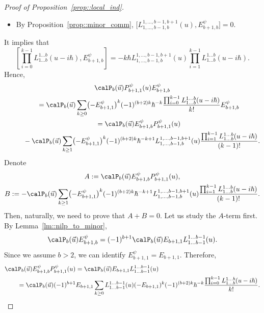 \begin{proof}[Proof of Proposition~\ref{prop::local_ind}]
\begin{itemize}
			\item By Proposition~\ref{prop::minor_comm},
$
			\bigl[L^{1,\dots,b-1,b+1}_{1,\dots,b-1,b}(u),E_{b+1,b}^{\psi}\bigr] = 0$.
		\end{itemize}
		It implies that
		\[
		\left[\prod_{i=0}^{k-1} L_{1\dots b}^{1\dots b}(u-i\hbar), E_{b+1,b}^{\psi} \right] = -k\hbar L_{1,\dots,b-1,b}^{1,\dots,b-1,b+1}(u) \prod_{i=1}^{k-1} L_{1\dots b}^{1\dots b}(u-i\hbar).
		\]
		Hence,
		\begin{gather*}
			\calP_{b}(\vec{u})P_{b+1,1}^{\psi}(u) E_{b+1,b}^{\psi} \\
			\qquad= \calP_{b}(\vec{u})\sum\limits_{k\geq 0} \bigl(-E_{b+1,1}^{\psi}\bigr)^k (-1)^{(b+2)k} \hbar^{-k} \frac{\prod_{i=0}^{k-1} L_{1\dots b}^{1\dots b}(u-i\hbar)}{k!} E_{b+1,b}^{\psi} \\
		\qquad	=\calP_{b}(\vec{u}) E_{b+1,b}^{\psi} P_{b+1,1}^{\psi}(u) \\
		\phantom{\qquad	=}{}	- \calP_{b}(\vec{u})\sum\limits_{k\geq 1} \bigl(-E_{b+1,1}^{\psi}\bigr)^k (-1)^{(b+2)k} \hbar^{-k+1} L_{1,\dots,b-1,b}^{1,\dots,b-1,b+1}(u) \frac{\prod_{i=1}^{k-1} L_{1\dots b}^{1\dots b}(u-i\hbar)}{(k-1)!}.
		\end{gather*}
		Denote
		\begin{gather}
				A := \calP_{b}(\vec{u}) E_{b+1,b}^{\psi} P_{b+1,1}^{\psi}(u),\nonumber \\
				B := -\calP_{b}(\vec{u})\sum\limits_{k\geq 1} \bigl(-E_{b+1,1}^{\psi}\bigr)^k (-1)^{(b+2)k} \hbar^{-k+1} L_{1,\dots,b-1,b}^{1,\dots,b-1,b+1}(u) \frac{\prod_{i=1}^{k-1} L_{1\dots b}^{1\dots b}(u-i\hbar)}{(k-1)!}	.		\label{eq::ab_terms}
		\end{gather}
		Then, naturally, we need to prove that
		$
		A + B = 0$.
		Let us study the $A$-term first. By Lemma~\ref{lm::nilp_to_minor},
		\[
		\calP_{b}(\vec{u}) E_{b+1,b}^{\psi} = (-1)^{b+1} \calP_{b}(\vec{u}) E_{b+1,1} L_{1\dots b-1}^{1\dots b-1}(u).
		\]
		Since we assume $b>2$, we can identify $E_{b+1,1}^{\psi} = E_{b+1,1}$. Therefore,
		\begin{gather*}
\begin{split}
& \calP_{b}(\vec{u}) E_{b+1,b}^{\psi} P_{b+1,1}^{\psi}(u)
=\calP_{b}(\vec{u}) E_{b+1,1} L_{1\dots b-1}^{1\dots b-1}(u) \\
&	\qquad= \calP_{b}(\vec{u}) (-1)^{b+1} E_{b+1,1} \sum\limits_{k\geq 0} L_{1\dots b-1}^{1\dots b-1}(u) (-E_{b+1,1})^k (-1)^{(b+2)k} \hbar^{-k} \frac{\prod_{i=0}^{k-1} L_{1\dots b}^{1\dots b}(u-i\hbar)}{k!}.
\end{split}
		\end{gather*}

\end{proof}
